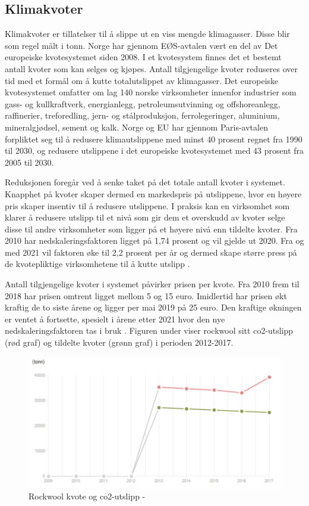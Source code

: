 \subsection{Klimakvoter}
Klimakvoter er tillatelser til å slippe ut en viss mengde klimagasser. Disse blir som regel målt i tonn. Norge har gjennom EØS-avtalen vært en del av Det europeiske kvotesystemet siden 2008. I et kvotesystem finnes det et bestemt antall kvoter som kan selges og kjøpes. Antall tilgjengelige kvoter reduseres over tid med et formål om å kutte totalutslippet av klimagasser. Det europeiske kvotesystemet omfatter om lag 140 norske virksomheter innenfor industrier som gass- og kullkraftverk, energianlegg, petroleumsutvinning og offshoreanlegg, raffinerier, treforedling, jern- og stålproduksjon, ferrolegeringer, aluminium, mineralgjødsel, sement og kalk. Norge og EU har gjennom Paris-avtalen forpliktet seg til å redusere klimautslippene med minst 40 prosent regnet fra 1990 til 2030, og redusere utslippene i det europeiske kvotesystemet med 43 prosent fra 2005 til 2030.

\indent \newline
Reduksjonen foregår ved å senke taket på det totale antall kvoter i systemet. Knapphet på kvoter skaper dermed en markedspris på utslippene, hvor en høyere pris skaper insentiv til å redusere utslippene. I praksis kan en virksomhet som klarer å redusere utslipp til et nivå som gir dem et overskudd av kvoter selge disse til andre virksomheter som ligger på et høyere nivå enn tildelte kvoter. Fra 2010 har nedskaleringsfaktoren ligget på 1,74 prosent og vil gjelde ut 2020. Fra og med 2021 vil faktoren øke til 2,2 prosent per år og dermed skape større press på de kvotepliktige virksomhetene til å kutte utslipp \cite{klimakvoter}.

\indent \newline
Antall tilgjengelige kvoter i systemet påvirker prisen per kvote. Fra 2010 frem til 2018 har prisen omtrent ligget mellom 5 og 15 euro. Imidlertid har prisen økt kraftig de to siste årene og ligger per mai 2019 på 25 euro. Den kraftige økningen er ventet å fortsette, spesielt i årene etter 2021 hvor den nye nedskaleringsfaktoren tas i bruk \cite{kvotemarked}.
Figuren under viser rockwool sitt co2-utslipp (rød graf) og tildelte kvoter (grønn graf) i perioden 2012-2017.

\begin{figure}[H]
  \includegraphics[width=\linewidth]{bilder/co2utslipp.png}
  \caption{Rockwool kvote og co2-utslipp - \cite{utslippkvote}}
  \label{fig:co2utslipp}
\end{figure}

